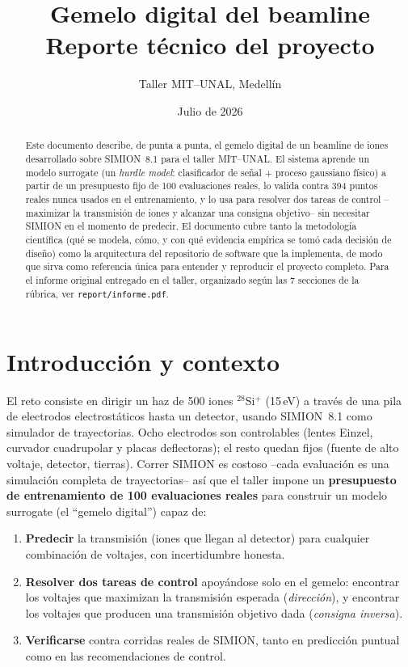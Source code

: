 \documentclass[11pt]{article}
\title{\Large Gemelo digital del beamline\\[0.3em]
  \large Reporte técnico del proyecto}
\author{Taller MIT--UNAL, Medellín}
\date{Julio de 2026}
\begin{document}
\maketitle

\begin{abstract}
\noindent
Este documento describe, de punta a punta, el gemelo digital de un beamline
de iones desarrollado sobre SIMION~8.1 para el taller MIT--UNAL. El sistema
aprende un modelo surrogate (un \emph{hurdle model}: clasificador de señal +
proceso gaussiano físico) a partir de un presupuesto fijo de 100 evaluaciones
reales, lo valida contra 394 puntos reales nunca usados en el entrenamiento,
y lo usa para resolver dos tareas de control --maximizar la transmisión de
iones y alcanzar una consigna objetivo-- sin necesitar SIMION en el momento
de predecir. El documento cubre tanto la metodología científica (qué se
modela, cómo, y con qué evidencia empírica se tomó cada decisión de diseño)
como la arquitectura del repositorio de software que la implementa, de modo
que sirva como referencia única para entender y reproducir el proyecto
completo. Para el informe original entregado en el taller, organizado según
las 7 secciones de la rúbrica, ver \texttt{report/informe.pdf}.
\end{abstract}

\tableofcontents

\section{Introducción y contexto}

El reto consiste en dirigir un haz de 500 iones $^{28}$Si$^+$ (15\,eV) a
través de una pila de electrodos electrostáticos hasta un detector, usando
SIMION~8.1 como simulador de trayectorias. Ocho electrodos son controlables
(lentes Einzel, curvador cuadrupolar y placas deflectoras); el resto quedan
fijos (fuente de alto voltaje, detector, tierras). Correr SIMION es costoso
--cada evaluación es una simulación completa de trayectorias-- así que el
taller impone un \textbf{presupuesto de entrenamiento de 100 evaluaciones
reales} para construir un modelo surrogate (el ``gemelo digital'') capaz de:

\begin{enumerate}
  \item \textbf{Predecir} la transmisión (iones que llegan al detector) para
  cualquier combinación de voltajes, con incertidumbre honesta.
  \item \textbf{Resolver dos tareas de control} apoyándose solo en el gemelo:
  encontrar los voltajes que maximizan la transmisión esperada
  (\emph{dirección}), y encontrar los voltajes que producen una transmisión
  objetivo dada (\emph{consigna inversa}).
  \item \textbf{Verificarse} contra corridas reales de SIMION, tanto en
  predicción puntual como en las recomendaciones de control.
\end{enumerate}
\end{document}

